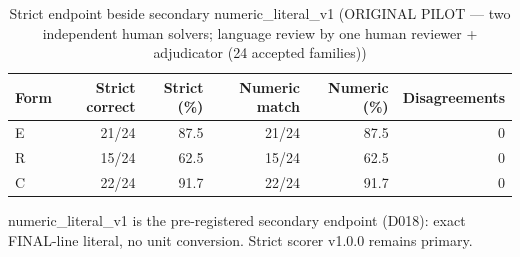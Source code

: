 \begin{table}[t]
\centering
\small
\caption{Strict endpoint beside secondary numeric\_literal\_v1 (ORIGINAL PILOT --- two independent human solvers; language review by one human reviewer + adjudicator (24 accepted families))}
\label{tab:pilotorig-Llama-3.2-3B-Instruct-numeric}
\begin{tabular}{lrrrrr}
\toprule
Form & Strict correct & Strict (\%) & Numeric match & Numeric (\%) & Disagreements \\
\midrule
E & 21/24 & 87.5 & 21/24 & 87.5 & 0 \\
R & 15/24 & 62.5 & 15/24 & 62.5 & 0 \\
C & 22/24 & 91.7 & 22/24 & 91.7 & 0 \\
\bottomrule
\end{tabular}
\par\smallskip
\parbox{\linewidth}{\footnotesize numeric\_literal\_v1 is the pre-registered secondary endpoint (D018): exact FINAL-line literal, no unit conversion. Strict scorer v1.0.0 remains primary.}
\end{table}
